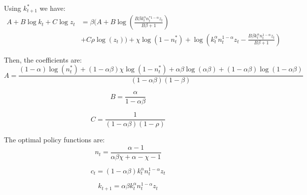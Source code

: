 \documentclass{article}
\begin{document}
Using \(k^*_{t+1}\) we have:
\begin{align*}
    A +  B \log k_t + C \log z_t &= \beta ( A + B \log ( \frac{B \beta k_t^\alpha n_t^{* 1 - \alpha} z_t}{B \beta + 1} ) \\
    &+ C \rho \log(z_t) ) + \chi \log\left( 1 - n^*_t\right) + \log ( k_t^\alpha n_t^{1 - \alpha} z_t - \frac{B \beta k_t^\alpha n_t^{1 - \alpha} z_t}{B \beta + 1} )
\end{align*}

Then, the coefficients are:\\
\begin{equation}
    A = \frac{(1-\alpha)\log(n^*_t) + (1 - \alpha\beta)\chi\log(1 - n^*_t) + \alpha\beta\log(\alpha\beta) +(1- \alpha\beta)\log(1-\alpha\beta)}{(1 - \alpha\beta)(1 - \beta)}
\end{equation}

\begin{equation}
    B = \frac{\alpha}{1-\alpha\beta}
\end{equation}

\begin{equation}
    C = \frac{1}{(1-\alpha\beta)(1-\rho)}
\end{equation}

The optimal policy functions are:\\
\begin{equation}
    n_t = \frac{{\alpha - 1}}{{\alpha \beta \chi + \alpha - \chi - 1}}
\end{equation}

\begin{equation}
    c_t = (1 -\alpha \beta) k_t^\alpha n_t^{1 - \alpha} z_t
\end{equation}

\begin{equation}
    k_{t+1} = \alpha \beta k_{t}^{\alpha} n_{t}^{1 - \alpha} z_{t}
\end{equation}
\end{document}
